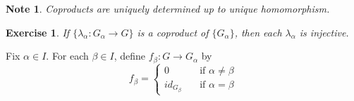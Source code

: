 \documentclass[twoside]{report}
\newcounter{Lecture}
\theoremstyle{myts}
\newcounter{c}[Lecture]
\newtheorem*{nte}{Note}
\newcounter{ex}
\newtheorem{exc}[ex]{Exercise }
\newenvironment{prf}{
  \noindent\begin{mdframed}[style=prf]}{\end{mdframed} \vspace{1em}
}
\begin{document}
\begin{nte}
  Coproducts are uniquely determined up to unique homomorphism.
\end{nte}

\begin{exc}
  If \( \{ \lambda_\alpha : G_\alpha \to G \} \) is a coproduct of \( \{ G_\alpha \} \), then each \(\lambda_\alpha\) is injective.
\end{exc}

\begin{prf}
  Fix \(\alpha\in I \). For each \( \beta\in I \), define \( f_\beta : G \to G_\alpha \) by
  \[
    f_\beta = 
    \begin{cases}
      0 &\quad \textrm{if } \alpha \neq \beta \\
      id_{G_\beta} &\quad \textrm{if } \alpha = \beta
    \end{cases}
  \]
\end{prf}
\end{document}
